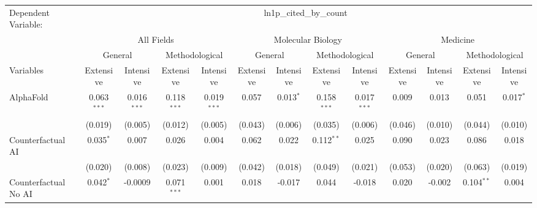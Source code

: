 \begingroup
\centering
\begin{tabular}{lcccccccccccc}
   \tabularnewline \midrule \midrule
   Dependent Variable: & \multicolumn{12}{c}{ln1p\_cited\_by\_count}\\
 & \multicolumn{4}{c}{All Fields} & \multicolumn{4}{c}{Molecular Biology} & \multicolumn{4}{c}{Medicine} \\
\cmidrule(lr){2-5} \cmidrule(lr){6-9} \cmidrule(lr){10-13}
 & \multicolumn{2}{c}{General} & \multicolumn{2}{c}{Methodological} & \multicolumn{2}{c}{General} & \multicolumn{2}{c}{Methodological} & \multicolumn{2}{c}{General} & \multicolumn{2}{c}{Methodological} \\
\cmidrule(lr){2-3} \cmidrule(lr){4-5} \cmidrule(lr){6-7} \cmidrule(lr){8-9} \cmidrule(lr){10-11} \cmidrule(lr){12-13}
Variables & \multicolumn{1}{c}{Extensive} & \multicolumn{1}{c}{Intensive} & \multicolumn{1}{c}{Extensive} & \multicolumn{1}{c}{Intensive} & \multicolumn{1}{c}{Extensive} & \multicolumn{1}{c}{Intensive} & \multicolumn{1}{c}{Extensive} & \multicolumn{1}{c}{Intensive} & \multicolumn{1}{c}{Extensive} & \multicolumn{1}{c}{Intensive} & \multicolumn{1}{c}{Extensive} & \multicolumn{1}{c}{Intensive} \\
\cmidrule(lr){1-1}\cmidrule(lr){2-2} \cmidrule(lr){3-3} \cmidrule(lr){4-4} \cmidrule(lr){5-5} \cmidrule(lr){6-6} \cmidrule(lr){7-7} \cmidrule(lr){8-8} \cmidrule(lr){9-9} \cmidrule(lr){10-10} \cmidrule(lr){11-11} \cmidrule(lr){12-12} \cmidrule(lr){13-13}
   AlphaFold                                & 0.063$^{***}$ & 0.016$^{***}$ & 0.118$^{***}$ & 0.019$^{***}$  & 0.057         & 0.013$^{*}$   & 0.158$^{***}$  & 0.017$^{***}$  & 0.009   & 0.013    & 0.051        & 0.017$^{*}$\\   
                                            & (0.019)       & (0.005)       & (0.012)       & (0.005)        & (0.043)       & (0.006)       & (0.035)        & (0.006)        & (0.046) & (0.010)  & (0.044)      & (0.010)\\   
   Counterfactual AI                        & 0.035$^{*}$   & 0.007         & 0.026         & 0.004          & 0.062         & 0.022         & 0.112$^{**}$   & 0.025          & 0.090   & 0.023    & 0.086        & 0.018\\   
                                            & (0.020)       & (0.008)       & (0.023)       & (0.009)        & (0.042)       & (0.018)       & (0.049)        & (0.021)        & (0.053) & (0.020)  & (0.063)      & (0.019)\\   
   Counterfactual No AI                     & 0.042$^{*}$   & -0.0009       & 0.071$^{***}$ & 0.001          & 0.018         & -0.017        & 0.044          & -0.018         & 0.020   & -0.002   & 0.104$^{**}$ & 0.004\\   

\end{tabular}
